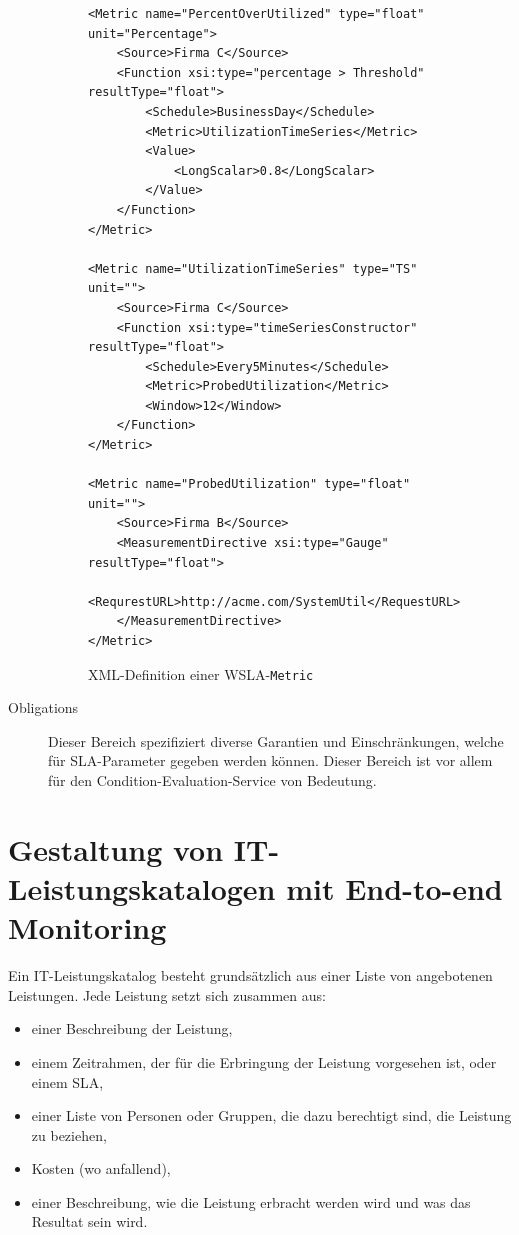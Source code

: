 \documentclass[11pt,listof=totoc]{scrreprt} %
\theoremstyle{definition}
\begin{document}
\begin{description}
\begin{figure}
\caption{XML-Definition einer WSLA-{\tt Metric}}
\label{wslametricxml}
\begin{lstlisting}
<Metric name="PercentOverUtilized" type="float" unit="Percentage">
	<Source>Firma C</Source>
	<Function xsi:type="percentage > Threshold" resultType="float">
		<Schedule>BusinessDay</Schedule>
		<Metric>UtilizationTimeSeries</Metric>
		<Value>
			<LongScalar>0.8</LongScalar>
		</Value>
	</Function>
</Metric>

<Metric name="UtilizationTimeSeries" type="TS" unit="">
	<Source>Firma C</Source>
	<Function xsi:type="timeSeriesConstructor" resultType="float">
		<Schedule>Every5Minutes</Schedule>
		<Metric>ProbedUtilization</Metric>
		<Window>12</Window>
	</Function>
</Metric>

<Metric name="ProbedUtilization" type="float" unit="">
	<Source>Firma B</Source>
	<MeasurementDirective xsi:type="Gauge" resultType="float">
		<RequrestURL>http://acme.com/SystemUtil</RequestURL>
	</MeasurementDirective>
</Metric>
\end{lstlisting}
\end{figure}

\item[Obligations] Dieser Bereich spezifiziert diverse Garantien und Einschränkungen, welche für SLA-Parameter gegeben werden können. Dieser Bereich ist vor allem für den Condition-Evaluation-Service von Bedeutung.
\end{description}

\section{Gestaltung von IT-Leistungskatalogen mit End-to-end Monitoring}

Ein IT-Leistungskatalog besteht grundsätzlich aus einer Liste von angebotenen Leistungen. Jede Leistung setzt sich zusammen aus:
\begin{itemize}
\item einer Beschreibung der Leistung,
\item einem Zeitrahmen, der für die Erbringung der Leistung vorgesehen ist, oder einem SLA,
\item einer Liste von Personen oder Gruppen, die dazu berechtigt sind, die Leistung zu beziehen,
\item Kosten (wo anfallend),
\item einer Beschreibung, wie die Leistung erbracht werden wird und was das Resultat sein wird. \cite{wiki:servicecatalog, FloresFineDuMoulin200703}
\end{itemize}
\end{document}
